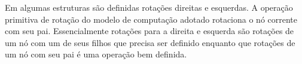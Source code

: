 \begin{comment}
\begin{programruledcaption}{Função splay.\label{prog:abb-gulosa}}
    \noindent\textbf{Entrada}: Recebe um vértice $x$ de uma ABB \\
    \textbf{Saída}: ABB com as chaves 1 a $n$ com respeito ao vetor $e$.
    \vspace{-0.5\baselineskip}
    \begin{lstlisting}[
        language={[brazilian]pseudocode},
        style=pseudocode,
        style=wider,
        functions={},
        specialidentifiers={},
        escapeinside={(*@}{@*)},
    ]
    (*@\bfseries\scshape{Função}@*) splay(x)
        y := x.pai
        se y == NULL: // x é raiz
            (*@\textbf{retorne}@*)
        se y.pai == NULL: // x é filho da raiz
            se y.esq = x:
                (*@\textbf{então}@*) rotação_direita(x) // caso zig
                (*@\textbf{senão}@*) rotação_esquerda(x) // caso zag
        se y.esq == x e y.pai.esq == y // caso zig-zig
            (*@\textbf{então}@*) rotação_direita(x)
            (*@\textbf{senão}@*) rotação_esquerda(x)
        se y.esq == x e y.pai.dir == y // caso zig-zag
            (*@\textbf{então}@*) rotação_direita(x)
            (*@\textbf{senão}@*) rotação_esquerda(x)
        se y.dir == x e y.pai.dir == y // caso zag-zag
            (*@\textbf{então}@*) rotação_direita(x)
            (*@\textbf{senão}@*) rotação_esquerda(x)
        se y.dir == x e y.pai.esq == y // caso zag-zig
            (*@\textbf{então}@*) rotação_direita(x)
            (*@\textbf{senão}@*) rotação_esquerda(x)
    devolva abb
    \end{lstlisting}
    \vspace{-0.5\baselineskip}
\end{programruledcaption}
\end{comment}

Em algumas estruturas são definidas rotações direitas e esquerdas. %
A operação primitiva de rotação do modelo de computação adotado rotaciona o nó corrente com seu pai. Essencialmente rotações para a direita e esquerda são rotações de um nó com um de seus filhos que precisa ser definido enquanto que rotações de um nó com seu pai é uma operação bem definida.


